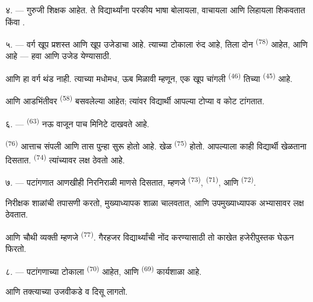 ४. ---  गुरुजी  शिक्षक आहेत. ते विद्यार्थ्यांना
परकीय भाषा बोलायला, वाचायला आणि लिहायला शिकवतात  किंवा .

५. --- वर्ग खूप प्रशस्त आणि खूप उजेडाचा आहे. त्याच्या टोकाला रुंद 
आहे, तिला दोन  \textsuperscript{(78)} आहेत, आणि 
आहे --- हवा आणि उजेड येण्यासाठी.

आणि हा वर्ग थंड नाही. त्याच्या मधोमध, ऊब मिळावी म्हणून, एक खूप चांगली 
\textsuperscript{(46)} तिच्या  \textsuperscript{(45)} आहे.

आणि आडभिंतीवर  \textsuperscript{(58)} बसवलेल्या आहेत; त्यांवर
विद्यार्थी आपल्या टोप्या व कोट टांगतात.

\VUsaut{5.2mm}
\VUsaut{3.6mm}

६. ---  \textsuperscript{(63)} नऊ वाजून पाच मिनिटे दाखवते आहे.

 \textsuperscript{(76)} आत्ताच संपली आणि तास पुन्हा सुरू होतो
आहे. खेळ  \textsuperscript{(75)} होतो. आपल्याला काही विद्यार्थी
खेळताना दिसतात.  \textsuperscript{(74)} त्यांच्यावर लक्ष
ठेवतो आहे.

७. --- पटांगणात आणखीही निरनिराळी माणसे दिसतात, म्हणजे 
\textsuperscript{(73)},  \textsuperscript{(71)}, आणि
 \textsuperscript{(72)}.

निरीक्षक शाळांची तपासणी करतो, मुख्याध्यापक शाळा चालवतात, आणि उपमुख्याध्यापक
अभ्यासावर लक्ष ठेवतात.

आणि चौथी व्यक्ती म्हणजे  \textsuperscript{(77)}. गैरहजर
विद्यार्थ्यांची नोंद करण्यासाठी तो काखेत हजेरीपुस्तक घेऊन फिरतो.

८. --- पटांगणाच्या टोकाला  \textsuperscript{(70)} आहेत,
आणि  \textsuperscript{(69)} कार्यशाळा आहे.

आणि तक्त्याच्या उजवीकडे  व  
दिसू लागतो.


